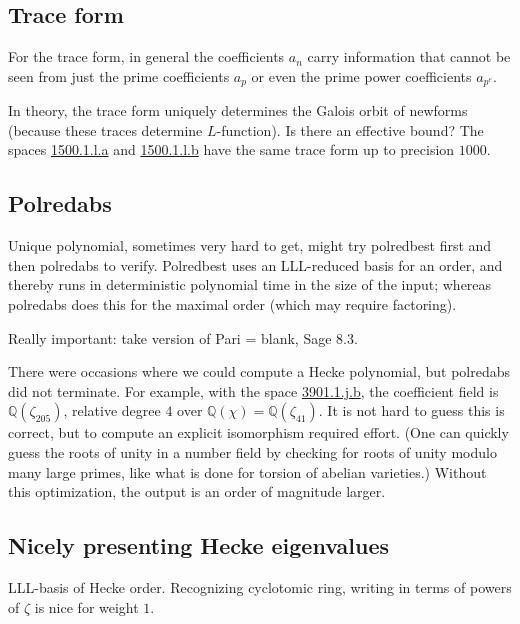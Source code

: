 \documentclass[11pt]{amsart}
\numberwithin{equation}{subsection}
\theoremstyle{plain}
\theoremstyle{definition}
\newcommand{\Q}{\mathbb{Q}}
\begin{document}
\subsection{Trace form}

For the trace form, in general the coefficients $a_n$ carry information that cannot be seen from just the prime coefficients $a_p$ or even the prime power coefficients $a_{p^e}$.

In theory, the trace form uniquely determines the Galois orbit of newforms (because these traces determine $L$-function).  Is there an effective bound?  The spaces \href{http://cmfs.lmfdb.xyz/ModularForm/GL2/Q/holomorphic/1500/1/l/a/}{\textsf{1500.1.l.a}} and \href{http://cmfs.lmfdb.xyz/ModularForm/GL2/Q/holomorphic/1500/1/l/b/}{\textsf{1500.1.l.b}} have the same trace form up to precision $1000$.  

\subsection{Polredabs}

Unique polynomial, sometimes very hard to get, might try polredbest first and then polredabs to verify.  Polredbest uses an LLL-reduced basis for an order, and thereby runs in deterministic polynomial time in the size of the input; whereas polredabs does this for the maximal order (which may require factoring).

Really important: take version of Pari = blank, Sage 8.3.

There were occasions where we could compute a Hecke polynomial, but polredabs did not terminate.  For example, with the space \href{http://cmfs.lmfdb.xyz/ModularForm/GL2/Q/holomorphic/3901/1/j/b/}{3901.1.j.b}, the coefficient field is $\Q(\zeta_{205})$, relative degree $4$ over $\Q(\chi)=\Q(\zeta_{41})$.  It is not hard to guess this is correct, but to compute an explicit isomorphism required effort.  (One can quickly guess the roots of unity in a number field by checking for roots of unity modulo many large primes, like what is done for torsion of abelian varieties.)  Without this optimization, the output is an order of magnitude larger.

\subsection{Nicely presenting Hecke eigenvalues}  \label{sec:LLLbasis}

LLL-basis of Hecke order.  Recognizing cyclotomic ring, writing in terms of powers of $\zeta$ is nice for weight $1$.
\end{document}
